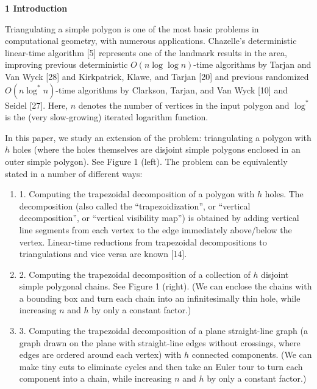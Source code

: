 \par\medskip\noindent\textbf{1 Introduction}\par
Triangulating a simple polygon is one of the most basic problems in computational geometry, with numerous applications. Chazelle’s deterministic linear-time algorithm [5] represents one of the landmark results in the area, improving previous deterministic $O(n\log\log n)$-time algorithms by Tarjan and Van Wyck [28] and Kirkpatrick, Klawe, and Tarjan [20] and previous randomized $O(n\log^{*}n)$-time algorithms by Clarkson, Tarjan, and Van Wyck [10] and Seidel [27]. Here, $n$ denotes the number of vertices in the input polygon and $\log^{*}$ is the (very slow-growing) iterated logarithm function.
\par
\par
In this paper, we study an extension of the problem: triangulating a polygon with $h$ holes (where the holes themselves are disjoint simple polygons enclosed in an outer simple polygon). See Figure 1 (left). The problem can be equivalently stated in a number of different ways:
\par
\begin{enumerate}
\item[]  1. 
Computing the trapezoidal decomposition of a polygon with $h$ holes. The decomposition (also called the “trapezoidization”, or “vertical decomposition”, or “vertical visibility map”) is obtained by adding vertical line segments from each vertex to the edge immediately above/below the vertex. Linear-time reductions from trapezoidal decompositions to triangulations and vice versa are known [14].
\par
\par
\item[]  2. 
Computing the trapezoidal decomposition of a collection of $h$ disjoint simple polygonal chains. See Figure 1 (right). (We can enclose the chains with a bounding box and turn each chain into an infinitesimally thin hole, while increasing $n$ and $h$ by only a constant factor.)
\par
\par
\item[]  3. 
Computing the trapezoidal decomposition of a plane straight-line graph (a graph drawn on the plane with straight-line edges without crossings, where edges are ordered around each vertex) with $h$ connected components. (We can make tiny cuts to eliminate cycles and then take an Euler tour to turn each component into a chain, while increasing $n$ and $h$ by only a constant factor.)
\par
\par
\end{enumerate}
